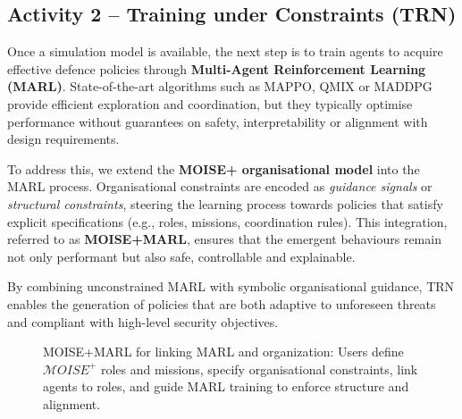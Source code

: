 \documentclass[a4paper,10pt,twocolumn]{article}
\begin{document}
\subsection*{Activity 2 – Training under Constraints (TRN)}

Once a simulation model is available, the next step is to train agents
to acquire effective defence policies through
\textbf{Multi-Agent Reinforcement Learning (MARL)}.
State-of-the-art algorithms such as MAPPO, QMIX or MADDPG provide
efficient exploration and coordination, but they typically optimise
performance without guarantees on safety, interpretability or alignment
with design requirements.

To address this, we extend the \textbf{MOISE+ organisational model} into
the MARL process. Organisational constraints are encoded as
\emph{guidance signals} or \emph{structural constraints}, steering the
learning process towards policies that satisfy explicit specifications
(e.g., roles, missions, coordination rules). This integration,
referred to as \textbf{MOISE+MARL}, ensures that the emergent behaviours
remain not only performant but also safe, controllable and explainable.

By combining unconstrained MARL with symbolic organisational guidance,
TRN enables the generation of policies that are both adaptive to
unforeseen threats and compliant with high-level security objectives.

\begin{figure}[h!]
    \centering
    \caption{MOISE+MARL for linking MARL and organization: Users define $\mathcal{M}OISE^+$ roles and missions, specify organisational constraints, link agents to roles, and guide MARL training to enforce structure and alignment.}
    \label{fig:mm_synthesis}
\end{figure}
\end{document}
